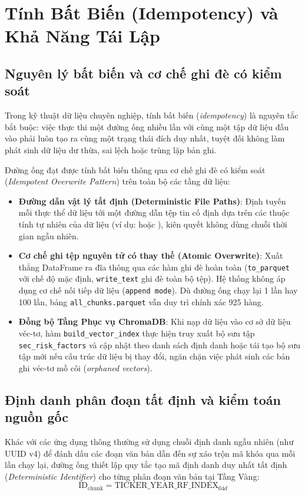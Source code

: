 \section{Tính Bất Biến (Idempotency) và Khả Năng Tái Lập}

\subsection{Nguyên lý bất biến và cơ chế ghi đè có kiểm soát}
Trong kỹ thuật dữ liệu chuyên nghiệp, tính bất biến (\textit{idempotency}) là nguyên tắc bắt buộc: việc thực thi một đường ống nhiều lần với cùng một tập dữ liệu đầu vào phải luôn tạo ra cùng một trạng thái đích duy nhất, tuyệt đối không làm phát sinh dữ liệu dư thừa, sai lệch hoặc trùng lặp bản ghi.

Đường ống đạt được tính bất biến thông qua cơ chế ghi đè có kiểm soát (\textit{Idempotent Overwrite Pattern}) trên toàn bộ các tầng dữ liệu:
\begin{itemize}
    \item \textbf{Đường dẫn vật lý tất định (Deterministic File Paths)}: Định tuyến mỗi thực thể dữ liệu tới một đường dẫn tệp tin cố định dựa trên các thuộc tính tự nhiên của dữ liệu (ví dụ:  hoặc ), kiên quyết không dùng chuỗi thời gian ngẫu nhiên.
    \item \textbf{Cơ chế ghi tệp nguyên tử có thay thế (Atomic Overwrite)}: Xuất thẳng DataFrame ra đĩa thông qua các hàm ghi đè hoàn toàn (\texttt{to\_parquet} với chế độ mặc định, \texttt{write\_text} ghi đè toàn bộ tệp). Hệ thống không áp dụng cơ chế nối tiếp dữ liệu (\texttt{append mode}). Dù đường ống chạy lại 1 lần hay 100 lần, bảng \texttt{all\_chunks.parquet} vẫn duy trì chính xác 925 hàng.
    \item \textbf{Đồng bộ Tầng Phục vụ ChromaDB}: Khi nạp dữ liệu vào cơ sở dữ liệu véc-tơ, hàm \texttt{build\_vector\_index} thực hiện truy xuất bộ sưu tập \texttt{sec\_risk\_factors} và cập nhật theo danh sách định danh hoặc tái tạo bộ sưu tập mới nếu cấu trúc dữ liệu bị thay đổi, ngăn chặn việc phát sinh các bản ghi véc-tơ mồ côi (\textit{orphaned vectors}).
\end{itemize}

\subsection{Định danh phân đoạn tất định và kiểm toán nguồn gốc}
Khác với các ứng dụng thông thường sử dụng chuỗi định danh ngẫu nhiên (như UUID v4) để đánh dấu các đoạn văn bản dẫn đến sự xáo trộn mã khóa qua mỗi lần chạy lại, đường ống thiết lập quy tắc tạo mã định danh duy nhất tất định (\textit{Deterministic Identifier}) cho từng phân đoạn văn bản tại Tầng Vàng:
\begin{equation}
    \text{ID}_{\text{chunk}} = \text{TICKER} \mathbin{\_} \text{YEAR} \mathbin{\_} \text{RF} \mathbin{\_} \text{INDEX}_{04d}
\end{equation}

